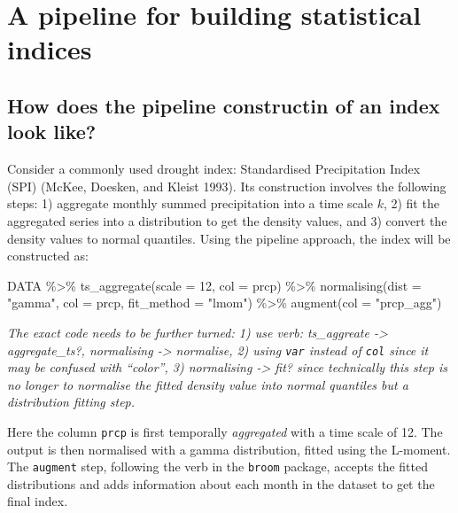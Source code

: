 \documentclass[
]{article}
\newenvironment{Shaded}{\begin{snugshade}}{\end{snugshade}}
\newcommand{\AttributeTok}[1]{\textcolor[rgb]{0.40,0.45,0.13}{#1}}
\newcommand{\DecValTok}[1]{\textcolor[rgb]{0.68,0.00,0.00}{#1}}
\newcommand{\FunctionTok}[1]{\textcolor[rgb]{0.28,0.35,0.67}{#1}}
\newcommand{\NormalTok}[1]{\textcolor[rgb]{0.00,0.23,0.31}{#1}}
\newcommand{\SpecialCharTok}[1]{\textcolor[rgb]{0.37,0.37,0.37}{#1}}
\newcommand{\StringTok}[1]{\textcolor[rgb]{0.13,0.47,0.30}{#1}}
\begin{document}
\newpage

\hypertarget{sec-a-pipeline-for-building-statistical-indices}{%
\section{A pipeline for building statistical
indices}\label{sec-a-pipeline-for-building-statistical-indices}}

\hypertarget{how-does-the-pipeline-constructin-of-an-index-look-like}{%
\subsection{How does the pipeline constructin of an index look
like?}\label{how-does-the-pipeline-constructin-of-an-index-look-like}}

Consider a commonly used drought index: Standardised Precipitation Index
(SPI) (McKee, Doesken, and Kleist 1993). Its construction involves the
following steps: 1) aggregate monthly summed precipitation into a time
scale \(k\), 2) fit the aggregated series into a distribution to get the
density values, and 3) convert the density values to normal quantiles.
Using the pipeline approach, the index will be constructed as:

\begin{Shaded}
\begin{Highlighting}[]
\NormalTok{DATA }\SpecialCharTok{\%\textgreater{}\%} 
  \FunctionTok{ts\_aggregate}\NormalTok{(}\AttributeTok{scale =} \DecValTok{12}\NormalTok{, }\AttributeTok{col =}\NormalTok{ prcp) }\SpecialCharTok{\%\textgreater{}\%} 
  \FunctionTok{normalising}\NormalTok{(}\AttributeTok{dist =} \StringTok{"gamma"}\NormalTok{, }\AttributeTok{col =}\NormalTok{ prcp, }\AttributeTok{fit\_method =} \StringTok{"lmom"}\NormalTok{) }\SpecialCharTok{\%\textgreater{}\%} 
  \FunctionTok{augment}\NormalTok{(}\AttributeTok{col =} \StringTok{"prcp\_agg"}\NormalTok{)}
\end{Highlighting}
\end{Shaded}

\emph{The exact code needs to be further turned: 1) use verb:
ts\_aggreate -\textgreater{} aggregate\_ts?, normalising -\textgreater{}
normalise, 2) using \texttt{var} instead of \texttt{col} since it may be
confused with ``color'', 3) normalising -\textgreater{} fit? since
technically this step is no longer to normalise the fitted density value
into normal quantiles but a distribution fitting step.}

Here the column \texttt{prcp} is first temporally \emph{aggregated} with
a time scale of 12. The output is then normalised with a gamma
distribution, fitted using the L-moment. The \texttt{augment} step,
following the verb in the \texttt{broom} package, accepts the fitted
distributions and adds information about each month in the dataset to
get the final index.
\end{document}
